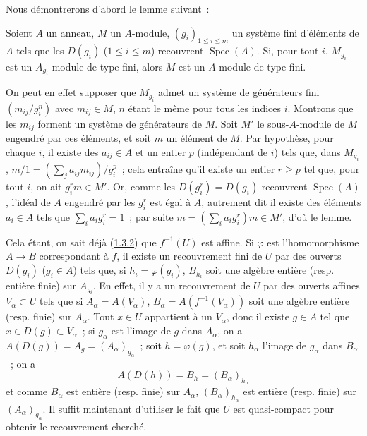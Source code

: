 
Nous démontrerons d'abord le lemme suivant~:

\begin{lemma}[6.1.4.1]
\label{II.6.1.4.1-fr}
Soient $A$ un anneau, $M$ un $A$-module, $(g_i)_{1\leq i\leq m}$ un système
fini d'éléments de $A$ tels que les $D(g_i)$ ($1\leq i\leq m$) recouvrent
$\operatorname{Spec}(A)$. Si, pour tout $i$, $M_{g_i}$ est un
$A_{g_i}$-module de type fini, alors $M$ est un $A$-module de type fini.
\end{lemma}

On peut en effet supposer que $M_{g_i}$ admet un système de générateurs fini
$(m_{ij}/g_i^n)$ avec $m_{ij}\in M$, $n$ étant le même pour tous les indices
$i$. Montrons que les $m_{ij}$ forment un système de générateurs de $M$. Soit
$M'$ le sous-$A$-module de $M$ engendré par ces éléments, et soit $m$ un
élément de $M$. Par hypothèse, pour chaque $i$, il existe des $a_{ij}\in A$ et
un entier $p$ (indépendant de $i$) tels que, dans $M_{g_i}$,
$m/1=(\sum_j a_{ij}m_{ij})/g_i^p$~; cela entraîne qu'il existe un entier
$r\geq p$ tel que, pour tout $i$, on ait $g_i^r m\in M'$. Or, comme les
$D(g_i^r)=D(g_i)$ recouvrent $\operatorname{Spec}(A)$, l'idéal de $A$
engendré par les $g_i^r$ est égal à $A$, autrement dit il existe des éléments
$a_i\in A$ tels que $\sum_i a_i g_i^r=1$~; par suite
$m=(\sum_i a_i g_i^r)m\in M'$, d'où le lemme.

Cela étant, on sait déjà (\hyperref[II.1.3.2-fr]{1.3.2}) que $f^{-1}(U)$ est
affine. Si $\varphi$ est l'homomorphisme $A\to B$ correspondant à $f$, il
existe un recouvrement fini de $U$ par des ouverts $D(g_i)$ ($g_i\in A$) tels
que, si $h_i=\varphi(g_i)$, $B_{h_i}$ soit une algèbre entière (resp. entière
finie) sur $A_{g_i}$. En effet, il y a un recouvrement de $U$ par des ouverts
affines $V_\alpha\subset U$ tels que si
$A_\alpha=A(V_\alpha)$, $B_\alpha=A(f^{-1}(V_\alpha))$ soit une algèbre
entière (resp. finie) sur $A_\alpha$. Tout $x\in U$ appartient à un
$V_\alpha$, donc il existe $g\in A$ tel que $x\in D(g)\subset V_\alpha$~; si
$g_\alpha$ est l'image de $g$ dans $A_\alpha$, on a
$A(D(g))=A_g=(A_\alpha)_{g_\alpha}$~; soit $h=\varphi(g)$, et soit $h_\alpha$
l'image de $g_\alpha$ dans $B_\alpha$~; on a
\[
A(D(h))=B_h=(B_\alpha)_{h_\alpha}
\]
et comme $B_\alpha$ est entière (resp. finie) sur $A_\alpha$,
$(B_\alpha)_{h_\alpha}$ est entière (resp. finie) sur
$(A_\alpha)_{g_\alpha}$. Il suffit maintenant d'utiliser le fait que $U$ est
quasi-compact pour obtenir le recouvrement cherché.

